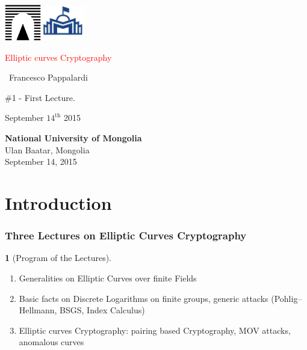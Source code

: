 \documentclass[10pt,handout]{beamer} %
\title[Elliptic curves over $\F_{q}$]{\insertlecture}
\theoremstyle{definition}
\newtheorem{Note}[theorem]{\translate{Note}}
\begin{document}
\begin{frame}
\includegraphics[width=1.6cm]{images/roma3.pdf}\hfill\includegraphics[width=1.9cm]{images/NUM2.jpeg}
\vfill

\begin{center}\begin{sc}
\begin{Large}

\textcolor{red}{Elliptic curves Cryptography}
\end{Large}\bigskip

\ {Francesco Pappalardi}\bigskip\bigskip

\begin{large}\begin{bf}\#1 - First Lecture.
\end{bf}\end{large}\medskip

September $14^{\text{th}}$ 2015\medskip
\vfill
\end{sc}\end{center}

\begin{minipage}[b]{9.3cm}
\textbf{National University of Mongolia}\\  %
Ulan Baatar, Mongolia\\
September 14, 2015
\end{minipage}\hfill
\end{frame}

\section{Introduction}

\begin{frame}
 \frametitle{Three Lectures on Elliptic Curves Cryptography}

 \begin{Note}[Program of the Lectures]
  \begin{enumerate}[<+-| alert@+>]
   \item Generalities on Elliptic Curves over finite Fields
   \item Basic facts on Discrete Logarithms on finite groups, generic attacks (Pohlig--Hellmann, BSGS, Index Calculus)
   \item Elliptic curves Cryptography: pairing based Cryptography, MOV attacks, anomalous curves
  \end{enumerate}
 \end{Note} 
\end{frame}
\end{document}

